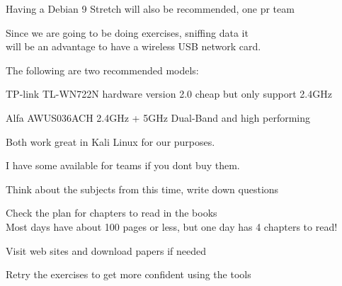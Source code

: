 \documentclass[Screen16to9,17pt]{foils}
\begin{document}
\centerline{Having a Debian 9 Stretch will also be recommended, one pr team}


Since we are going to be doing exercises, sniffing data it \\
will be an advantage to have a wireless USB network card.
\begin{list2}
\item The following are two recommended models:
\item TP-link TL-WN722N hardware version 2.0 cheap but only support 2.4GHz
\item Alfa AWUS036ACH 2.4GHz + 5GHz Dual-Band and high performing
\item   Both work great in Kali Linux for our purposes.
\end{list2}

I have some available for teams if you dont buy them.






\begin{list2}
\item Think about the subjects from this time, write down questions
\item Check the plan for chapters to read in the books\\
Most days have about 100 pages or less, but one day has 4 chapters to read!
\item Visit web sites and download papers if needed
\item Retry the exercises to get more confident using the tools
\end{list2}
\end{document}
